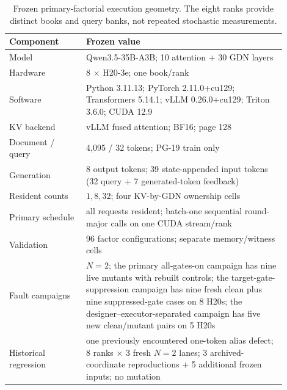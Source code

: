 \documentclass{article}
\begin{document}
\begin{table}[H]
  \caption{Frozen primary-factorial execution geometry.  The eight ranks
  provide distinct books and query banks, not repeated stochastic
  measurements.}
  \label{tab:protocol}
  \centering
  \small
  \begin{tabular}{@{}p{0.25\linewidth}p{0.65\linewidth}@{}}
    \toprule
    Component & Frozen value \\
    \midrule
    Model & Qwen3.5-35B-A3B; 10 attention + 30 GDN layers \\
    Hardware & 8 $\times$ H20-3e; one book/rank \\
    Software & Python 3.11.13; PyTorch 2.11.0+cu129; Transformers 5.14.1; vLLM 0.26.0+cu129; Triton 3.6.0; CUDA 12.9 \\
    KV backend & vLLM fused attention; BF16; page 128 \\
    Document / query & 4,095 / 32 tokens; PG-19 train only \\
    Generation & 8 output tokens; 39 state-appended input tokens (32 query + 7 generated-token feedback) \\
    Resident counts & $1,8,32$; four KV-by-GDN ownership cells \\
    Primary schedule & all requests resident; batch-one sequential round-major calls on one CUDA stream/rank \\
    Validation & 96 factor configurations; separate memory/witness cells \\
    Fault campaigns & $N=2$; the primary all-gates-on campaign has nine live mutants with rebuilt controls; the target-gate-suppression campaign has nine fresh clean plus nine suppressed-gate cases on 8 H20s; the designer--executor-separated campaign has five new clean/mutant pairs on 5 H20s \\
    Historical regression & one previously encountered one-token alias defect; 8 ranks $\times$ 3 fresh $N=2$ lanes; 3 archived-coordinate reproductions + 5 additional frozen inputs; no mutation \\
    \bottomrule
  \end{tabular}
\end{table}
\end{document}
